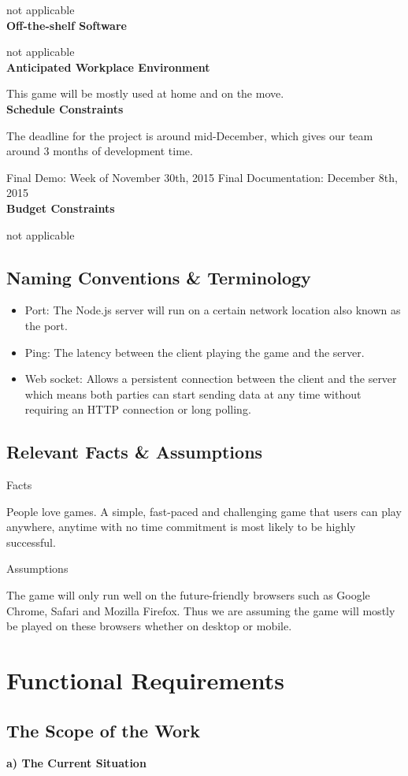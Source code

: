 \documentclass[12pt]{article}
\begin{document}
not applicable\\
\textbf{Off-the-shelf Software}

not applicable\\
\textbf{Anticipated Workplace Environment}

This game will be mostly used at home and on the move.\\
\textbf{Schedule Constraints}

The deadline for the project is around mid-December, which gives our team around 3 months of development time.

Final Demo: Week of November 30th, 2015 
Final Documentation: December 8th, 2015\\
\textbf{Budget Constraints}

not applicable
\subsection{Naming Conventions & Terminology}
\begin{itemize}
\item{Port: The Node.js server will run on a certain network location also known as the port.}
\item{Ping: The latency between the client playing the game and the server.}
\item{Web socket: Allows a persistent connection between the client and the server which means both parties can start sending data at any time without requiring an HTTP connection or long polling.}
\end{itemize}
\subsection{Relevant Facts & Assumptions}

Facts

People love games. A simple, fast-paced and challenging game that users can play anywhere, anytime with no time commitment is most likely to be highly successful.

Assumptions

The game will only run well on the future-friendly browsers such as Google Chrome, Safari and Mozilla Firefox. Thus we are assuming the game will mostly be played on these browsers whether on desktop or mobile.
\section{Functional Requirements}
\subsection{The Scope of the Work}
	\textbf{a) The Current Situation}
\end{document}
